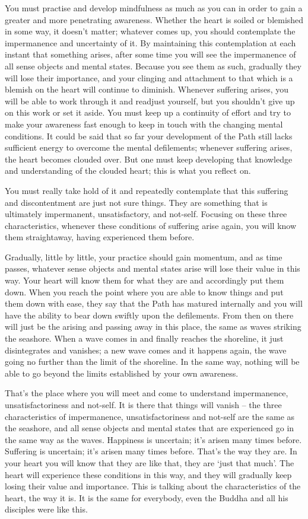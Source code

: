 You must practise and develop mindfulness as much as you can in order to
gain a greater and more penetrating awareness. Whether the heart is
soiled or blemished in some way, it doesn't matter; whatever comes up,
you should contemplate the impermanence and uncertainty of it. By
maintaining this contemplation at each instant that something arises,
after some time you will see the impermanence of all sense objects and
mental states. Because you see them as such, gradually they will lose
their importance, and your clinging and attachment to that which is a
blemish on the heart will continue to diminish. Whenever suffering
arises, you will be able to work through it and readjust yourself, but
you shouldn't give up on this work or set it aside. You must keep up a
continuity of effort and try to make your awareness fast enough to keep
in touch with the changing mental conditions. It could be said that so
far your development of the Path still lacks sufficient energy to
overcome the mental defilements; whenever suffering arises, the heart
becomes clouded over. But one must keep developing that knowledge and
understanding of the clouded heart; this is what you reflect on.

You must really take hold of it and repeatedly contemplate that this
suffering and discontentment are just not sure things. They are
something that is ultimately impermanent, unsatisfactory, and not-self.
Focusing on these three characteristics, whenever these conditions of
suffering arise again, you will know them straightaway, having
experienced them before.

Gradually, little by little, your practice should gain momentum, and as
time passes, whatever sense objects and mental states arise will lose
their value in this way. Your heart will know them for what they are and
accordingly put them down. When you reach the point where you are able
to know things and put them down with ease, they say that the Path has
matured internally and you will have the ability to bear down swiftly
upon the defilements. From then on there will just be the arising and
passing away in this place, the same as waves striking the seashore.
When a wave comes in and finally reaches the shoreline, it just
disintegrates and vanishes; a new wave comes and it happens again, the
wave going no further than the limit of the shoreline. In the same way,
nothing will be able to go beyond the limits established by your own
awareness.

That's the place where you will meet and come to understand
impermanence, unsatisfactoriness and not-self. It is there that things
will vanish -- the three characteristics of impermanence,
unsatisfactoriness and not-self are the same as the seashore, and all
sense objects and mental states that are experienced go in the same way
as the waves. Happiness is uncertain; it's arisen many times before.
Suffering is uncertain; it's arisen many times before. That's the way
they are. In your heart you will know that they are like that, they are
`just that much'. The heart will experience these conditions in this
way, and they will gradually keep losing their value and importance.
This is talking about the characteristics of the heart, the way it is.
It is the same for everybody, even the Buddha and all his disciples were
like this.

